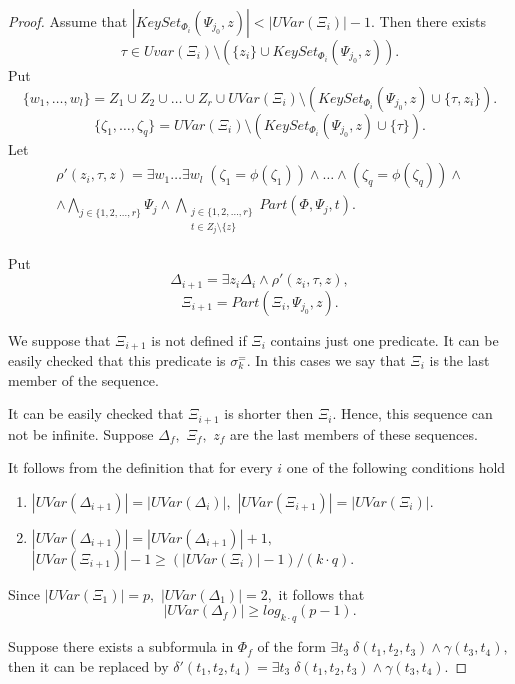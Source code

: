 \documentclass{au}
\theoremstyle{plain}
\theoremstyle{definition}
\theoremstyle{remark}
\numberwithin{equation}{section}
\begin{document}
\begin{proof}
Assume that $|KeySet_{\Phi_{i}}(\Psi_{j_{0}},z)| < |UVar(\Xi_{i})|-1.$
Then there exists $$\tau \in Uvar(\Xi_{i})\setminus (\{z_{i}\}\cup KeySet_{\Phi_{i}}(\Psi_{j_{0}},z)).$$
Put $$\{w_{1},\ldots,w_{l}\} = Z_{1}\cup Z_{2}\cup\ldots \cup Z_{r} \cup
UVar(\Xi_{i})\setminus (KeySet_{\Phi_{i}}(\Psi_{j_{0}},z)\cup\{\tau,z_{i}\}).$$
$$\{\zeta_{1},\ldots,\zeta_{q}\} =
UVar(\Xi_{i})\setminus (KeySet_{\Phi_{i}}(\Psi_{j_{0}},z)\cup\{\tau\}).$$
Let
\begin{multline*}\rho'(z_{i},\tau,z) =
\exists w_{1}\ldots \exists w_{l} \;
(\zeta_{1} = \phi(\zeta_{1})) \wedge
\ldots
\wedge
(\zeta_{q} = \phi(\zeta_{q})) \wedge \\ \wedge
\bigwedge\limits_{j \in \{1,2,\ldots,r\}} \Psi_{j} \wedge
\bigwedge\limits_{\substack{j\in \{1,2,\ldots,r\}\\ t\in Z_{j}\setminus \{z\}}} Part(\Phi, \Psi_{j}, t).\end{multline*}

Put $$\Delta_{i+1} =
\exists z_{i}
\Delta_{i} \wedge \rho'(z_{i},\tau,z),$$
$$\Xi_{i+1} = Part(\Xi_{i}, \Psi_{j_{0}}, z).$$

We suppose that
$\Xi_{i+1}$ is not defined if $\Xi_{i}$ contains just one predicate.
It can be easily checked that
this predicate is $\sigma_{k}^{=}.$
In this cases we say that $\Xi_{i}$ is the last member of the sequence.

It can be easily checked that
$\Xi_{i+1}$ is shorter then $\Xi_{i}.$
Hence, this sequence can not be infinite.
Suppose $\Delta_{f},$ $\Xi_{f},$ $z_{f}$ are the last members of these sequences.

It follows from the definition that
for every $i$
one of the following conditions hold

\begin{enumerate}

\item 
$|UVar(\Delta_{i+1})| = |UVar(\Delta_{i})|,$
$|UVar(\Xi_{i+1})| = |UVar(\Xi_{i})|.$

\item $|UVar(\Delta_{i+1})| = |UVar(\Delta_{i+1})|+1,$
$|UVar(\Xi_{i+1})|-1 \ge (|UVar(\Xi_{i})|-1)/(k\cdot q).$
\end{enumerate}

Since $|UVar(\Xi_{1})| = p,$
$|UVar(\Delta_{1})| = 2,$
it follows that $$|UVar(\Delta_{f})|\ge log_{k\cdot q}(p-1).$$

Suppose there exists a subformula in $\Phi_{f}$
of the form
$\exists t_{3}\;\delta(t_{1},t_{2},t_{3})\wedge \gamma(t_{3},t_{4}),$
then it can be replaced by
$\delta'(t_{1},t_{2},t_{4}) = \exists t_{3}\;\delta(t_{1},t_{2},t_{3})\wedge \gamma(t_{3},t_{4}).$


\end{proof}
\end{document}
